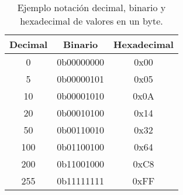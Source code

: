 \begin{table}
    \caption{Ejemplo notación decimal, binario y hexadecimal de valores en un byte.}
    \label{table:decBinHex}
    \centering  
     \begin{tabular}{c|c|c}
     	\toprule
     	Decimal & Binario & Hexadecimal \\
     	\midrule
     	0 & 0b00000000 & 0x00 \\
     	5 & 0b00000101 & 0x05 \\
     	10 & 0b00001010 & 0x0A \\
     	20 & 0b00010100 & 0x14 \\
     	50 & 0b00110010 & 0x32 \\
     	100 & 0b01100100 & 0x64 \\
     	200 & 0b11001000 & 0xC8 \\
     	255 & 0b11111111 & 0xFF \\
     	\bottomrule
     \end{tabular}
\end{table}
